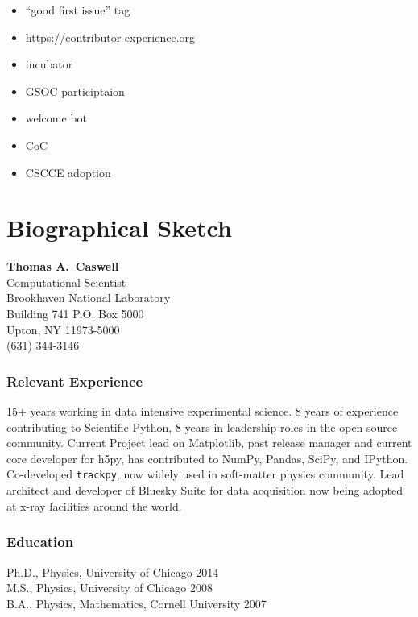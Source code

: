 \documentclass[12pt]{article}
\numberwithin{page}{section}
\begin{document}
  \begin{itemize}
  \item  ``good first issue'' tag
  \item https://contributor-experience.org
  \item incubator
  \item GSOC participtaion
  \item welcome bot
  \item CoC
  \item CSCCE adoption
  \end{itemize}





\newpage
\section{Biographical Sketch}
\setcounter{page}{1}
\begin{center}
  \textbf{Thomas A.\ Caswell}\\
  Computational Scientist\\
  Brookhaven National Laboratory\\
  Building 741 P.O. Box 5000\\
  Upton, NY 11973-5000\\
  (631) 344-3146\\
\end{center}

\subsubsection*{Relevant Experience}
15+ years working in data intensive experimental science.  8 years of
experience contributing to Scientific Python, 8 years in leadership roles in
the open source community.  Current Project lead on Matplotlib, past release
manager and current core developer for h5py, has contributed to NumPy, Pandas,
SciPy, and IPython.  Co-developed \texttt{trackpy}, now widely used in
soft-matter physics community.  Lead architect and developer of Bluesky Suite
for data acquisition now being adopted at x-ray facilities around the world.

\subsubsection*{Education}
Ph.D., Physics, University of Chicago \hfill 2014\\
M.S., Physics, University of Chicago \hfill 2008\\
B.A., Physics, Mathematics, Cornell University \hfill 2007
\end{document}

